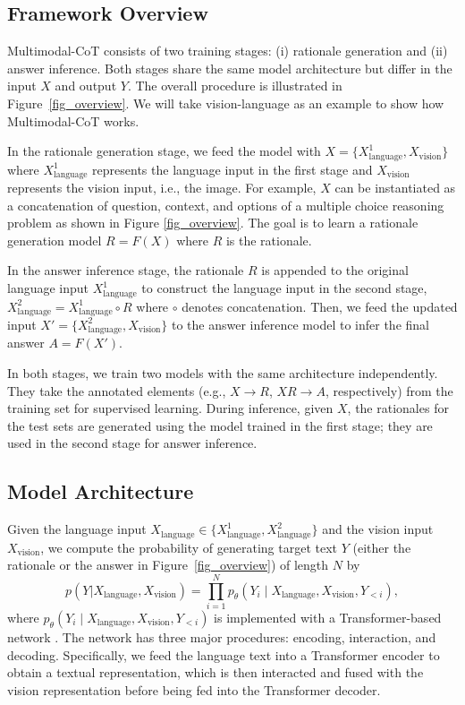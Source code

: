 \documentclass[nohyperref]{article}
\theoremstyle{plain}
\theoremstyle{definition}
\theoremstyle{remark}
\begin{document}
\subsection{Framework Overview}
Multimodal-CoT consists of two training stages: (i) rationale generation and (ii) answer inference. Both stages share the same model architecture but differ in the input $X$ and output $Y$. The overall procedure is illustrated in Figure~\ref{fig_overview}. We will take vision-language as an example to show how Multimodal-CoT works.

In the rationale generation stage, we feed the model with $X=\{X_{\textrm{language}}^{1}, X_{\textrm{vision}}\}$ where $X_{\textrm{language}}^{1}$ represents the language input in the first stage and $X_{\textrm{vision}}$ represents the vision input, i.e., the image. For example, $X$ can be instantiated as a concatenation of question, context, and options of a multiple choice reasoning problem \citep{lu2022learn} as shown in Figure \ref{fig_overview}. The goal is to learn a rationale generation model ${R} = F(X)$ where ${R}$ is the rationale.

In the answer inference stage, the rationale $R$ is appended to the original language input $X_{\textrm{language}}^{1}$ to construct the language input in the second stage, $X_{\textrm{language}}^{2} = X_{\textrm{language}}^{1} \circ {R}$ where $\circ$ denotes concatenation. Then, we feed the updated input $X'=\{X_{\textrm{language}}^{2}, X_{\textrm{vision}}\}$ to the answer inference model to infer the final answer $A = F(X')$.

{In both stages, we train two models with the same architecture independently.} They take the annotated elements (e.g., $X\rightarrow R$, $XR\rightarrow A$, respectively) from the training set for supervised learning. During inference, given $X$, the rationales for the test sets are generated using the model trained in the first stage; they are used in the second stage for answer inference.

\subsection{Model Architecture}
Given the language input $X_{\textrm{language}} \in \{X_{\textrm{language}}^{1}, X_{\textrm{language}}^{2}\}$ and the vision input $X_{\textrm{vision}}$, we compute the probability of generating target text $Y$ (either the rationale or the answer in Figure~\ref{fig_overview}) of length $N$ by
\begin{equation}
	\label{eq:gated}
	p(Y|X_{\textrm{language}},X_{\textrm{vision}}) = \prod_{i=1}^{N} p_{\theta}\left(Y_{i} \mid X_{\textrm{language}}, X_{\textrm{vision}}, Y_{<i}\right),
\end{equation}
where $p_{\theta}\left(Y_{i} \mid X_{\textrm{language}}, X_{\textrm{vision}}, Y_{<i}\right)$ is implemented with a Transformer-based network \citep{vaswani2017attention}. The network has three major procedures: encoding, interaction, and decoding. Specifically, we feed the language text into a Transformer encoder to obtain a textual representation, which is then interacted and fused with the vision representation before being fed into the Transformer decoder.
\end{document}
